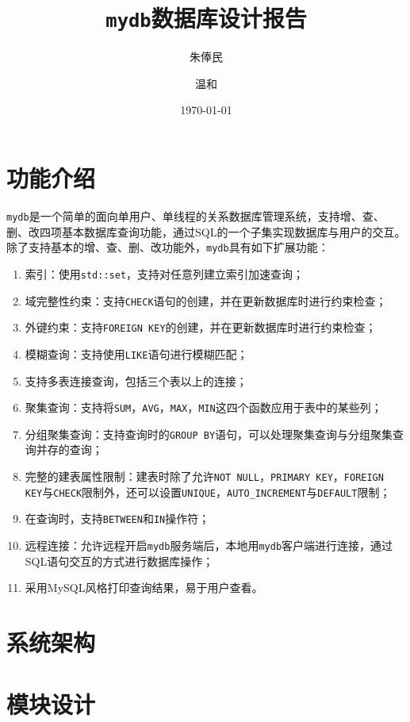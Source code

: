 \documentclass[11pt, a4paper]{article}
\title{\textbf{\texttt{mydb}数据库设计报告}}
\author{\kai 朱俸民 \and \kai 温和}
\date{\kai \today}
\begin{document}
\maketitle

\section{功能介绍}

\texttt{mydb}是一个简单的面向单用户、单线程的关系数据库管理系统，支持增、查、删、改四项基本数据库查询功能，通过SQL的一个子集实现数据库与用户的交互。除了支持基本的增、查、删、改功能外，\texttt{mydb}具有如下扩展功能：

\begin{enumerate}
    \item 索引：使用\texttt{std::set}，支持对任意列建立索引加速查询；
    \item 域完整性约束：支持\texttt{CHECK}语句的创建，并在更新数据库时进行约束检查；
    \item 外键约束：支持\texttt{FOREIGN KEY}的创建，并在更新数据库时进行约束检查；
    \item 模糊查询：支持使用\texttt{LIKE}语句进行模糊匹配；
    \item 支持多表连接查询，包括三个表以上的连接；
    \item 聚集查询：支持将\texttt{SUM}，\texttt{AVG}，\texttt{MAX}，\texttt{MIN}这四个函数应用于表中的某些列；
    \item 分组聚集查询：支持查询时的\texttt{GROUP BY}语句，可以处理聚集查询与分组聚集查询并存的查询；
    \item 完整的建表属性限制：建表时除了允许\texttt{NOT NULL}，\texttt{PRIMARY KEY}，\texttt{FOREIGN KEY}与\texttt{CHECK}限制外，还可以设置\texttt{UNIQUE}，\texttt{AUTO\_INCREMENT}与\texttt{DEFAULT}限制；
    \item 在查询时，支持\texttt{BETWEEN}和\texttt{IN}操作符；
    \item 远程连接：允许远程开启\texttt{mydb}服务端后，本地用\texttt{mydb}客户端进行连接，通过SQL语句交互的方式进行数据库操作；
    \item 采用MySQL风格打印查询结果，易于用户查看。
\end{enumerate}

\section{系统架构}



\section{模块设计}
\end{document}
